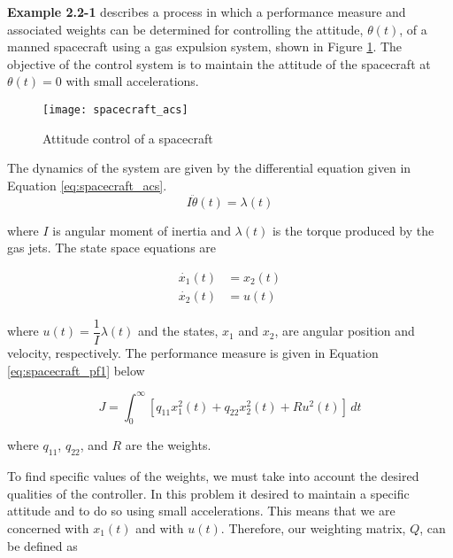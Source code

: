 
\begin{question}{1}
\end{question}
\textbf{Example 2.2-1} describes a process in which a performance measure and
associated weights can be determined for controlling the attitude, $\theta(t)$,
of a manned spacecraft using a gas expulsion system, shown in Figure \ref{fig:spacecraft_acs}.
The objective of the control system is to maintain the attitude of the
spacecraft at $\theta(t) = 0$ with small accelerations.

\begin{figure}[H]
    \texttt{[image: spacecraft\_acs]}
    \centering
    \caption{Attitude control of a spacecraft \cite{kirkdover}}
    \label{fig:spacecraft_acs}
\end{figure}

The dynamics of the system are given by the differential equation given in
Equation \ref{eq:spacecraft_acs}. 
\begin{equation}
    I \ddot{\theta}(t) = \lambda(t) \label{eq:spacecraft_acs}
\end{equation}

\noindent where $I$ is angular moment of inertia and $\lambda(t)$ is the
torque produced by the gas jets. The state space equations are

\begin{align}
    \dot{x_1}(t) &= x_2 (t) \label{eq:sc_ssr_s1} \\
    \dot{x_2}(t) &= u (t) \label{eq:sc_ssr_x2}
\end{align}

\noindent where $u(t) = \dfrac{1}{I} \lambda(t)$ and the states, $x_1$ and 
$x_2$, are angular position and velocity, respectively. The performance measure 
is given in Equation \ref{eq:spacecraft_pf1} below

\begin{equation}
    J = \int_{0}^{\infty} [q_{11} x_1^2(t) + q_{22} x_2^2(t) + R u^2 (t)] \, dt
    \label{eq:spacecraft_pf1}
\end{equation}

\noindent where $q_{11}$, $q_{22}$, and $R$ are the weights. 

To find specific values of the weights, we must take into account the desired 
qualities of the controller. In this problem it desired to maintain a specific 
attitude and to do so using small accelerations. This means that we are 
concerned with $x_1(t)$ and with $u(t)$. Therefore, our weighting matrix, $Q$,
can be defined as

